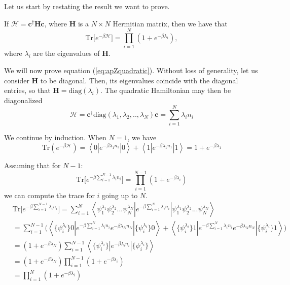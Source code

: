 Let us start by restating the result we want to prove.

If $\mathcal{H} = \bm c^\dagger \bm H \bm c$, where $\bm H$ is a $N \times N$ Hermitian matrix, then we have that
\begin{equation}\label{eq:apZquadratic}
\text{Tr} \big[ e^{-\beta \mathcal{H} } \big] = \prod_{i=1}^N ( 1 + e^{-\beta \lambda_{i} } ) ,
\end{equation}
where $\lambda_{i}$ are the eigenvalues of $\bm H$. 

We will now prove equation (\ref{eq:apZquadratic}). Without loss of generality, let us consider $\bm H$ to be diagonal. Then, its eigenvalues coincide with the diagonal entries, so that $\bm H = \text{diag}(\lambda_{i} )$. The quadratic Hamiltonian may then be diagonalized
\begin{equation*}
\mathcal{H} = {\bm c}^\dagger \text{diag} (\lambda_{1}, \lambda_{2}, .., \lambda_{N}) \bm c = \sum_{i=1}^N \lambda_{i} n_{i}
\end{equation*}

We continue by induction. When $N=1$, we have
\begin{equation}
\text{Tr} (e^{-\beta\mathcal{H} } ) = \left\langle 0 \left| e^{-\beta \lambda_{1} n_{1}}  \right| 0 \right\rangle + \left\langle 1 \left| e^{-\beta \lambda_{1} n_{1}}   \right| 1 \right\rangle = 1 + e^{-\beta \lambda_{1} }
\end{equation}

Assuming that for $N-1$:
\begin{equation*}
\text{Tr} \big[ e^{-\beta \sum_{i=1}^{N-1} \lambda_{i} n_{i} } \big] = \prod_{i=1}^{N-1} ( 1 + e^{-\beta \lambda_{i} } )
\end{equation*}
we can compute the trace for $i$ going up to $N$.
\begin{equation*}
\begin{split}
&\text{Tr} \big[ e^{-\beta \sum_{i=1}^{N-1} \lambda_{i} n_{i} } \big] = \sum_{i=1}^{N} \left\langle \psi_1^{\lambda_1} \psi_2^{\lambda_2} ... \psi_N^{\lambda_N} \left| e^{-\beta \sum_{i=1}^N \lambda_{i} n_{i}}  \right| \psi_1^{\lambda_1} \psi_2^{\lambda_2} ... \psi_N^{\lambda_N} \right\rangle \\
&= \sum_{i=1}^{N-1} \bigg( \left\langle \{\psi_i^{\lambda_i}\} 0 \left| e^{-\beta \sum_{i=1}^N \lambda_{i} n_{i}} e^{-\beta \lambda_{N} n_{N}} \right| \{\psi_i^{\lambda_i}\} 0 \right\rangle + \left\langle \{\psi_i^{\lambda_i}\} 1 \left| e^{-\beta \sum_{i=1}^N \lambda_{i} n_{i}} e^{-\beta \lambda_{N} n_{N}} \right| \{\psi_i^{\lambda_i}\} 1 \right\rangle \bigg) \\
&= (1 + e^{-\beta \lambda_{N} } ) \sum_{i=1}^{N-1} \left\langle \{\psi_i^{\lambda_i}\} \left| e^{-\beta \lambda_{i} n_{i}} \right| \{\psi_i^{\lambda_i}\} \right\rangle \\
&= (1 + e^{-\beta \lambda_{N} } ) \prod_{i=1}^{N-1} (1 + e^{-\beta \lambda_{i} } ) \\
&= \prod_{i=1}^{N} (1 + e^{-\beta \lambda_{i} } )
\end{split}
\end{equation*}

